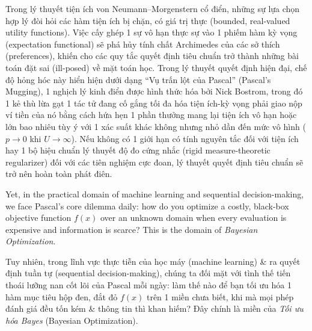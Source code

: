 \documentclass[11pt]{article}
\begin{document}
Trong lý thuyết tiện ích von Neumann--Morgenstern cổ điển, những sự lựa chọn hợp lý đòi hỏi các hàm tiện ích bị chặn, có giá trị thực (bounded, real-valued utility functions). Việc cấy ghép 1 sự vô hạn thực sự vào 1 phiếm hàm kỳ vọng (expectation functional) sẽ phá hủy tính chất Archimedes của các sở thích (preferences), khiến cho các quy tắc quyết định tiêu chuẩn trở thành những bài toán đặt sai (ill-posed) về mặt toán học. Trong lý thuyết quyết định hiện đại, chế độ hỏng hóc này hiển hiện dưới dạng ``Vụ trấn lột của Pascal'' (Pascal's Mugging), 1 nghịch lý kinh điển được hình thức hóa bởi Nick Bostrom, trong đó 1 kẻ thù lừa gạt 1 tác tử đang cố gắng tối đa hóa tiện ích-kỳ vọng phải giao nộp ví tiền của nó bằng cách hứa hẹn 1 phần thưởng mang lại tiện ích vô hạn hoặc lớn bao nhiêu tùy ý với 1 xác suất khác không nhưng nhỏ dần đến mức vô hình ($p \to 0$ khi $U \to \infty$). Nếu không có 1 giới hạn có tính nguyên tắc đối với tiện ích hay 1 bộ hiệu chuẩn lý thuyết độ đo cứng nhắc (rigid measure-theoretic regularizer) đối với các tiên nghiệm cực đoan, lý thuyết quyết định tiêu chuẩn sẽ trở nên hoàn toàn phát điên.

Yet, in the practical domain of machine learning and sequential decision-making, we face Pascal's core dilemma daily: how do you optimize a costly, black-box objective function $f(x)$ over an unknown domain when every evaluation is expensive and information is scarce? This is the domain of \emph{Bayesian Optimization}.

Tuy nhiên, trong lĩnh vực thực tiễn của học máy (machine learning) \& ra quyết định tuần tự (sequential decision-making), chúng ta đối mặt với tình thế tiến thoái lưỡng nan cốt lõi của Pascal mỗi ngày: làm thế nào để bạn tối ưu hóa 1 hàm mục tiêu hộp đen, đắt đỏ $f(x)$ trên 1 miền chưa biết, khi mà mọi phép đánh giá đều tốn kém \& thông tin thì khan hiếm? Đây chính là miền của \emph{Tối ưu hóa Bayes} (Bayesian Optimization).
\end{document}
